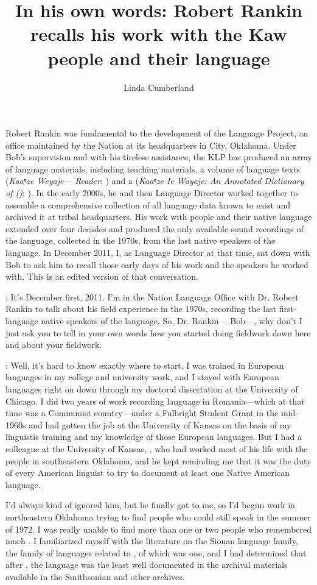 \documentclass[output=paper]{LSP/langsci}
\author{Linda Cumberland}
\title{In his own words: Robert Rankin recalls his work with the Kaw people and their language}
\begin{document}
Robert Rankin was fundamental to the development of the  Language Project, an office maintained by the  Nation at its headquarters in  City, Oklahoma. Under Bob's supervision and with his tireless assistance, the KLP has produced an array of language materials, including teaching materials, a volume of  language texts (\textit{Kaaⁿze Weyaje}---\textit{ Reader}; \citealt{KanzaLP2010}) and a  (\textit{Kaaⁿze Ie Wayaje: An Annotated Dictionary of  ()}; \citealt{CumberlandRankin2012}). In the early 2000s, he and then Language Director  worked together to assemble a comprehensive collection of all  language data known to exist and archived it at tribal headquarters. His work with  people and their native language extended over four decades and produced the only available sound recordings of the language, collected in the 1970s, from the last native speakers of the language. In December 2011, I, as Language Director at that time, sat down with Bob to ask him to recall those early days of his work and the speakers he worked with. This is an edited version of that conversation.

: It's December first, 2011. I'm in the  Nation Language Office with Dr. Robert Rankin to talk about his field experience in the 1970s, recording the last first-language native speakers of the  language. So, Dr. Rankin ---Bob---, why don't I just ask you to tell in your own words how you started doing fieldwork down here and about your fieldwork.

:  Well, it's hard to know exactly where to start. I was trained in European languages in my college and university work, and I stayed with European languages right on down through my doctoral dissertation at the University of Chicago. I did two years of work recording  language  in Romania---which at that time was a Communist country---under a Fulbright Student Grant in the mid-1960s and had gotten the job at the University of Kansas on the basis of my linguistic training and my knowledge of those European languages. But I had a colleague at the University of Kansas, , who had worked most of his life with the  people in southeastern Oklahoma, and he kept reminding me that it was the duty of every American linguist to try to document at least one Native American language. 

I'd always kind of ignored him, but he finally got to me, so I'd begun work in northeastern Oklahoma trying to find people who could still speak  in the summer of 1972. I was really unable to find more than one or two people who remembered much . I familiarized myself with the literature on the Siouan language family, the family of languages related to  , of which  was one, and I had determined that after , the  language was the least well documented in the archival materials available in the Smithsonian and other archives. 
\end{document}
